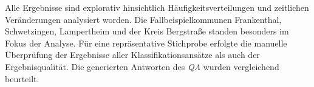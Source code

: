 Alle Ergebnisse sind explorativ hinsichtlich Häufigkeitsverteilungen und zeitlichen Veränderungen analysiert worden. Die Fallbeispielkommunen Frankenthal, Schwetzingen, Lampertheim und der Kreis Bergstraße standen besonders im Fokus der Analyse. Für eine repräsentative Stichprobe erfolgte die manuelle Überprüfung der Ergebnisse aller Klassifikationsansätze als auch der Ergebnisqualität. Die generierten Antworten des \textit{QA} wurden vergleichend beurteilt.